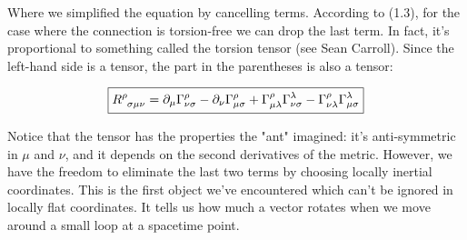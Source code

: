 \documentclass[10pt]{article}
\begin{document}
Where we simplified the equation by cancelling terms. According to (1.3), for the case where the connection is torsion-free we can drop the last term. In fact, it's proportional to something called the torsion tensor (see Sean Carroll). Since the left-hand side is a tensor, the part in the parentheses is also a tensor:

\begin{align}
    \boxed{\tensor{R}{^\rho_\sigma_\mu_\nu} = \partial_\mu \Gamma^\rho_{\nu \sigma}-\partial_\nu \Gamma^\rho_{\mu \sigma} + \Gamma^\rho_{\mu \lambda}\Gamma^{\lambda}_{\nu \sigma} - \Gamma^{\rho}_{\nu \lambda}\Gamma^{\lambda}_{\mu \sigma}}
\end{align}

Notice that the tensor has the properties the "ant" imagined: it's anti-symmetric in $\mu$ and $\nu$, and it depends on the second derivatives of the metric. However, we have the freedom to eliminate the last two terms by choosing locally inertial coordinates. This is the first object we've encountered which can't be ignored in locally flat coordinates. It tells us how much a vector rotates when we move around a small loop at a spacetime point.
\end{document}

